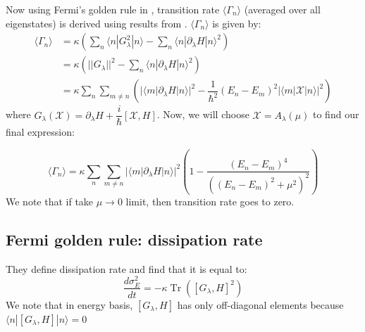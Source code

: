 \documentclass[11pt,a4paper]{article}
\DeclareMathOperator{\Tr}{Tr}
\begin{document}
Now using Fermi's golden rule in \cite{kolodrubetz2016geometry},  transition rate $\langle \Gamma_n \rangle$ (averaged over all eigenstates) is derived using results from \cite{clerk2010introduction}. $\langle \Gamma_n \rangle$ is given by:
\begin{align}
\langle \Gamma_n \rangle &= \kappa\left( \sum_n \langle n | G^2_{\lambda}| n \rangle -  \sum_n \langle n |    \partial_{\lambda} H |    n \rangle ^2\right) \\
&= \kappa\left( | | G_{\lambda}||^2 -  \sum_n \langle n |    \partial_{\lambda} H |    n \rangle ^2\right) \\
&=\kappa \sum_n \sum_{m \neq n} \left( |\langle m | \partial_{\lambda} H| n \rangle|^2  - \dfrac{1}{\hbar^2}  (E_n-E_m)^2 |\langle m |  \mathcal{X}| n \rangle|^2 \right)
\end{align}
where  $G_{\lambda}(\mathcal{X} )= \partial_{\lambda} H + \dfrac{i}{\hbar} [\mathcal{X}, H] $. Now, we will choose $\mathcal{X}=A_{\lambda}(\mu) $ to find our final expression:

\begin{equation}
\boxed{
\langle \Gamma_n \rangle=\kappa \sum_n \sum_{m \neq n}  |\langle m | \partial_{\lambda} H| n \rangle|^2 \left( 1- \dfrac{(E_n-E_m)^4}{((E_n-E_m)^2 + \mu^2)^2}  \right)
}
\end{equation}
We note that if take $\mu \rightarrow 0$ limit, then transition rate goes to zero.

%
%
\subsection{Fermi golden rule: dissipation rate}

They define dissipation rate and find that it is equal to:
\begin{equation}
\dfrac{d \sigma^2_E}{dt}= -\kappa \Tr ([G_{\lambda}, H]^2)
\end{equation}
We note that in energy basis, $[G_{\lambda}, H]$ has only off-diagonal elements because $\langle n |[G_{\lambda}, H] | n \rangle=0$
\end{document}
